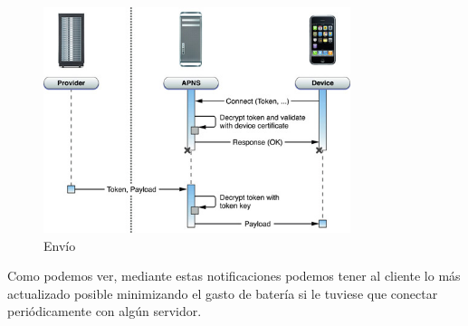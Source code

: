  \begin{figure}[h!]
    \centering
       \includegraphics[width=0.8\textwidth]{./images/token_trust.jpg}
     \caption{Envío}
   \label{fig:Notificacion envio}
\end{figure}

 Como podemos ver, mediante estas notificaciones podemos tener al cliente lo más actualizado posible minimizando el gasto de batería si le tuviese que conectar periódicamente con algún servidor. \cite{betfair:web}


